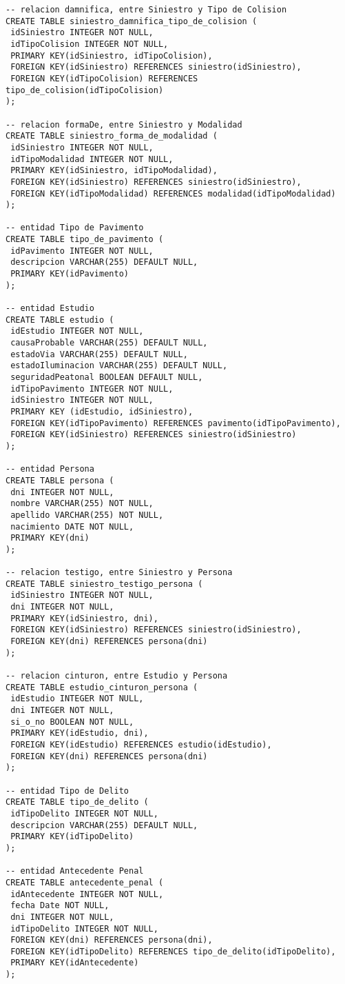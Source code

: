 \begin{verbatim}
-- relacion damnifica, entre Siniestro y Tipo de Colision
CREATE TABLE siniestro_damnifica_tipo_de_colision (
 idSiniestro INTEGER NOT NULL,
 idTipoColision INTEGER NOT NULL,
 PRIMARY KEY(idSiniestro, idTipoColision),
 FOREIGN KEY(idSiniestro) REFERENCES siniestro(idSiniestro),
 FOREIGN KEY(idTipoColision) REFERENCES tipo_de_colision(idTipoColision)
);

-- relacion formaDe, entre Siniestro y Modalidad
CREATE TABLE siniestro_forma_de_modalidad (
 idSiniestro INTEGER NOT NULL,
 idTipoModalidad INTEGER NOT NULL,
 PRIMARY KEY(idSiniestro, idTipoModalidad),
 FOREIGN KEY(idSiniestro) REFERENCES siniestro(idSiniestro),
 FOREIGN KEY(idTipoModalidad) REFERENCES modalidad(idTipoModalidad)
);

-- entidad Tipo de Pavimento
CREATE TABLE tipo_de_pavimento (
 idPavimento INTEGER NOT NULL,
 descripcion VARCHAR(255) DEFAULT NULL,
 PRIMARY KEY(idPavimento)
);

-- entidad Estudio
CREATE TABLE estudio (
 idEstudio INTEGER NOT NULL,
 causaProbable VARCHAR(255) DEFAULT NULL,
 estadoVia VARCHAR(255) DEFAULT NULL,
 estadoIluminacion VARCHAR(255) DEFAULT NULL,
 seguridadPeatonal BOOLEAN DEFAULT NULL,
 idTipoPavimento INTEGER NOT NULL,
 idSiniestro INTEGER NOT NULL,
 PRIMARY KEY (idEstudio, idSiniestro),
 FOREIGN KEY(idTipoPavimento) REFERENCES pavimento(idTipoPavimento),
 FOREIGN KEY(idSiniestro) REFERENCES siniestro(idSiniestro)
);

-- entidad Persona
CREATE TABLE persona (
 dni INTEGER NOT NULL,
 nombre VARCHAR(255) NOT NULL,
 apellido VARCHAR(255) NOT NULL,
 nacimiento DATE NOT NULL,
 PRIMARY KEY(dni)
);

-- relacion testigo, entre Siniestro y Persona
CREATE TABLE siniestro_testigo_persona (
 idSiniestro INTEGER NOT NULL,
 dni INTEGER NOT NULL,
 PRIMARY KEY(idSiniestro, dni),
 FOREIGN KEY(idSiniestro) REFERENCES siniestro(idSiniestro),
 FOREIGN KEY(dni) REFERENCES persona(dni)
);

-- relacion cinturon, entre Estudio y Persona
CREATE TABLE estudio_cinturon_persona (
 idEstudio INTEGER NOT NULL,
 dni INTEGER NOT NULL,
 si_o_no BOOLEAN NOT NULL,
 PRIMARY KEY(idEstudio, dni),
 FOREIGN KEY(idEstudio) REFERENCES estudio(idEstudio),
 FOREIGN KEY(dni) REFERENCES persona(dni)
);

-- entidad Tipo de Delito
CREATE TABLE tipo_de_delito (
 idTipoDelito INTEGER NOT NULL,
 descripcion VARCHAR(255) DEFAULT NULL,
 PRIMARY KEY(idTipoDelito)
);

-- entidad Antecedente Penal
CREATE TABLE antecedente_penal (
 idAntecedente INTEGER NOT NULL,
 fecha Date NOT NULL,
 dni INTEGER NOT NULL,
 idTipoDelito INTEGER NOT NULL,
 FOREIGN KEY(dni) REFERENCES persona(dni),
 FOREIGN KEY(idTipoDelito) REFERENCES tipo_de_delito(idTipoDelito),
 PRIMARY KEY(idAntecedente)
);


\end{verbatim}

